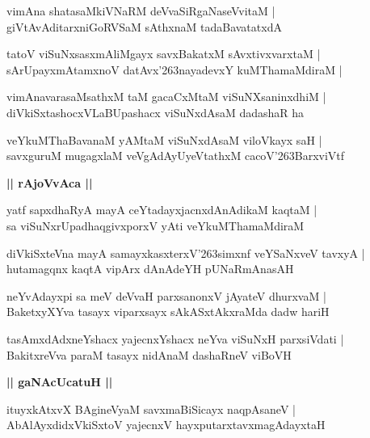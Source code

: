 \documentclass[twoside,12pt,openright]{book}
\def\S{\char'263}
\newcounter{shloka}[chapter]
\def\uvaca#1{\centerline{{\large\textbf{#1}}}}
\begin{document}
\begin{shloka}%
vimAna shatasaMkiVNaRM deVvaSiRgaNaseVvitaM |\\
giVtAvAditarxniGoRVSaM sAthxnaM tadaBavatatxdA 
\end{shloka}

\begin{shloka}%
tatoV viSuNxsasxmAliMgayx savxBakatxM sAvxtivxvarxtaM |\\
sArUpayxmAtamxnoV datAvx\S nayadevxY kuMThamaMdiraM |\\
\end{shloka}

\begin{shloka}%
vimAnavarasaMsathxM taM gacaCxMtaM viSuNXsaninxdhiM |\\
diVkiSxtashocxVLaBUpashacx viSuNxdAsaM dadashaR ha
\end{shloka}

\begin{shloka}%
veYkuMThaBavanaM yAMtaM viSuNxdAsaM viloVkayx saH |\\
savxguruM mugagxlaM veVgAdAyUyeVtathxM cacoV\S BarxviVtf 
\end{shloka}

\uvaca{|| rAjoVvAca ||}

\begin{shloka}%
yatf sapxdhaRyA mayA ceYtadayxjacnxdAnAdikaM kaqtaM |\\
sa viSuNxrUpadhaqgivxporxV yAti veYkuMThamaMdiraM 
\end{shloka}

\begin{shloka}%
diVkiSxteVna mayA samayxkasxterxV\S simxnf veYSaNxveV tavxyA |\\
hutamagqnx kaqtA vipArx dAnAdeYH pUNaRmAnasAH 
\end{shloka}

\begin{shloka}%
neYvAdayxpi sa meV deVvaH parxsanonxV jAyateV dhurxvaM |\\
BaketxyXYva tasayx viparxsayx sAkASxtAkxraMda dadw hariH 
\end{shloka}

\begin{shloka}%
tasAmxdAdxneYshacx yajecnxYshacx neYva viSuNxH parxsiVdati |\\
BakitxreVva paraM tasayx nidAnaM dashaRneV viBoVH
\end{shloka}

\uvaca{|| gaNAcUcatuH ||}

\begin{shloka}%
ituyxkAtxvX BAgineVyaM savxmaBiSicayx naqpAsaneV |\\
AbAlAyxdidxVkiSxtoV yajecnxV hayxputarxtavxmagAdayxtaH 
\end{shloka}
\end{document}

